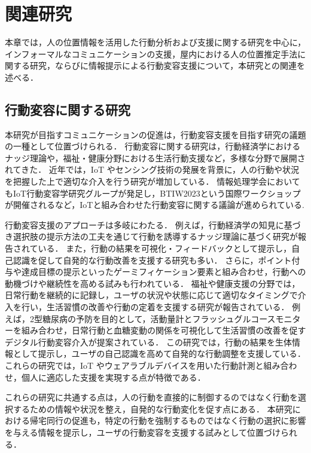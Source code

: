 \thispagestyle{myheadings}
\chapter{関連研究}
\label{sec:format}
本章では，人の位置情報を活用した行動分析および支援に関する研究を中心に，インフォーマルなコミュニケーションの支援，屋内における人の位置推定手法に関する研究，ならびに情報提示による行動変容支援について，本研究との関連を述べる．


\section{行動変容に関する研究}
本研究が目指すコミュニケーションの促進は，行動変容支援を目指す研究の議題の一種として位置づけられる．
行動変容に関する研究は，行動経済学におけるナッジ理論や，福祉・健康分野における生活行動支援など，多様な分野で展開されてきた．
近年では，IoT やセンシング技術の発展を背景に，人の行動や状況を把握した上で適切な介入を行う研究が増加している．
情報処理学会においてもIoT行動変容学研究グループが発足し，BTIW2023\cite{BTIW2023}という国際ワークショップが開催されるなど，IoTと組み合わせた行動変容に関する議論が進められている.


行動変容支援のアプローチは多岐にわたる．
例えば，行動経済学の知見に基づき選択肢の提示方法の工夫を通じて行動を誘導するナッジ理論に基づく研究\cite{nadge}\cite{nadge:body}が報告されている．
また，行動の結果を可視化・フィードバックとして提示し，自己認識を促して自発的な行動改善を支援する研究\cite{feedback:sit}も多い．
さらに，ポイント付与や達成目標の提示といったゲーミフィケーション要素と組み合わせ，行動への動機づけや継続性を高める試み\cite{game:health}も行われている．
福祉や健康支援の分野では，日常行動を継続的に記録し，ユーザの状況や状態に応じて適切なタイミングで介入を行い，生活習慣の改善や行動の定着を支援する研究が報告されている．
例えば，2型糖尿病の予防を目的として，活動量計とフラッシュグルコースモニターを組み合わせ，日常行動と血糖変動の関係を可視化して生活習慣の改善を促すデジタル行動変容介入が提案されている\cite{CGM}．
この研究では，行動の結果を生体情報として提示し，ユーザの自己認識を高めて自発的な行動調整を支援している．
これらの研究では，IoT やウェアラブルデバイスを用いた行動計測と組み合わせ，個人に適応した支援を実現する点が特徴である．


これらの研究に共通する点は，人の行動を直接的に制御するのではなく行動を選択するための情報や状況を整え，自発的な行動変化を促す点にある．
本研究における帰宅同行の促進も，特定の行動を強制するものではなく行動の選択に影響を与える情報を提示し，ユーザの行動変容を支援する試みとして位置づけられる．

